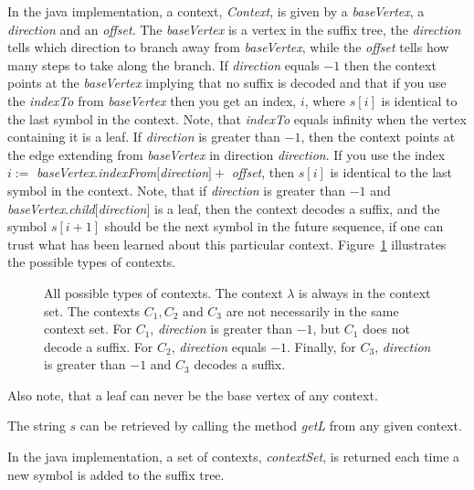 \documentclass[a4paper,11pt]{report}
\begin{document}
In the java implementation, a context, {\it Context}, is given by a {\it baseVertex}, a {\it direction}
and an {\it offset}. The {\it baseVertex} is a vertex in the suffix tree, the {\it direction} tells
which direction to branch away from {\it baseVertex}, while the {\it offset} tells how many steps to take
along the branch. If {\it direction} equals $-1$ then the context points at the {\it baseVertex} implying
that no suffix is decoded and that if you use the {\it indexTo} from {\it baseVertex} then you get an
index, $i$, where $s[i]$ is identical to the last symbol in the context. Note, that {\it indexTo} equals
infinity when the vertex containing it is a leaf. If {\it direction} is greater
than $-1$, then the context points at the edge extending from {\it baseVertex} in direction
{\it direction}. If you use the index $i:=$ {\it baseVertex}.{\it indexFrom}$[${\it direction}$] + $
{\it offset}, then $s[i]$ is identical to the last symbol in the context. Note, that if {\it direction}
is greater than $-1$ and {\it baseVertex}.{\it child}$[${\it direction}$]$ is a leaf, then the context
decodes a suffix, and the symbol $s[i+1]$ should be the next symbol in the future sequence, if one can
trust what has been learned about this particular context. Figure~\ref{fig:contexts} illustrates the
possible types of contexts.
\begin{figure}
  \centering
  \caption{All possible types of contexts. The context $\lambda$ is always in the context set. The
  contexts $C_1, C_2$ and $C_3$ are not necessarily in the same context set. For $C_1$, {\it direction}
  is greater than $-1$, but $C_1$ does not decode a suffix. For $C_2$, {\it direction} equals $-1$.
  Finally, for $C_3$, {\it direction} is greater than $-1$ and $C_3$ decodes a suffix.}
  \label{fig:contexts}
\end{figure}
Also note, that a leaf can never be the base vertex of any context.

The string $s$ can be retrieved by calling the method {\it getL} from any given context.


In the java implementation, a set of contexts, {\it contextSet}, is returned each time a new symbol
is added to the suffix tree.
\end{document}
